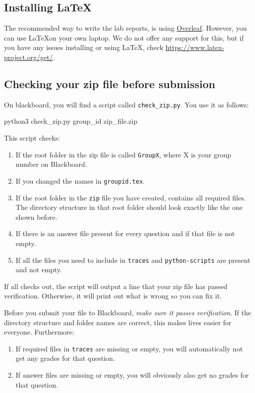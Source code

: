 \subsection*{Installing \LaTeX}
The recommended way to write the lab reports, is using \href{https://overleaf.com}{Overleaf}. However, you can use \LaTeX on your own laptop. We do not offer any support for this, but if you have any issues installing or using \LaTeX, check \url{https://www.latex-project.org/get/}.

\subsection*{Checking your zip file before submission}
On blackboard, you will find a script called \verb|check_zip.py|. You use it as follows:
\begin{cmdblock}[gobble=1]
	python3 check_zip.py group_id zip_file.zip
\end{cmdblock}

This script checks:
\begin{enumerate}
	\item If the root folder in the zip file is called \verb|GroupX|, where X is your group number on Blackboard.
	\item If you changed the names in \verb|groupid.tex|.
	\item If the root folder in the \verb|zip| file you have created, contains all required files. The directory structure in that root folder should look exactly like the one shown before.
	\item If there is an answer file present for every question and if that file is not empty.
	\item If all the files you need to include in \verb|traces| and \verb|python-scripts| are present and not empty.
\end{enumerate}

If all checks out, the script will output a line that your zip file has passed verification. Otherwise, it will print out what is wrong so you can fix it.

Before you submit your file to Blackboard, \emph{make sure it passes verification}. If the directory structure and folder names are correct, this makes lives easier for everyone. Furthermore:
\begin{enumerate}
	\item If required files in \verb|traces| are missing or empty, you will automatically not get any grades for that question.
	\item If answer files are missing or empty, you will obviously also get no grades for that question.
\end{enumerate}

